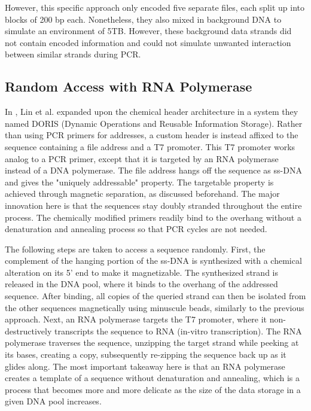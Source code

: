 \documentclass[a4paper,conference]{IEEEtran}
\begin{document}

However, this specific approach only encoded five separate files, each split up into blocks of 200 bp each. Nonetheless, they also mixed in background DNA to simulate an environment of 5TB. However, these background data strands did not contain encoded information and could not simulate unwanted interaction between similar strands during PCR.

\subsection{Random Access with RNA Polymerase}
In \cite{DORIS}, Lin et al. expanded upon the chemical header architecture in a system they named DORIS (Dynamic Operations and Reusable Information Storage). Rather than using PCR primers for addresses, a custom header is instead affixed to the sequence containing a file address and a T7 promoter. This T7 promoter works analog to a PCR primer, except that it is targeted by an RNA polymerase instead of a DNA polymerase. The file address hangs off the sequence as ss-DNA and gives the "uniquely addressable" property. The targetable property is achieved through magnetic separation, as discussed beforehand. The major innovation here is that the sequences stay doubly stranded throughout the entire process. The chemically modified primers readily bind to the overhang without a denaturation and annealing process so that PCR cycles are not needed. 

The following steps are taken to access a sequence randomly. First, the complement of the hanging portion of the ss-DNA is synthesized with a chemical alteration on its 5' end to make it magnetizable. The synthesized strand is released in the DNA pool, where it binds to the overhang of the addressed sequence. After binding, all copies of the queried strand can then be isolated from the other sequences magnetically using minuscule beads, similarly to the previous approach. Next, an RNA polymerase targets the T7 promoter, where it non-destructively transcripts the sequence to RNA (in-vitro transcription). The RNA polymerase traverses the sequence, unzipping the target strand while peeking at its bases, creating a copy, subsequently re-zipping the sequence back up as it glides along. The most important takeaway here is that an RNA polymerase creates a template of a sequence without denaturation and annealing, which is a process that becomes more and more delicate as the size of the data storage in a given DNA pool increases.
\end{document}
